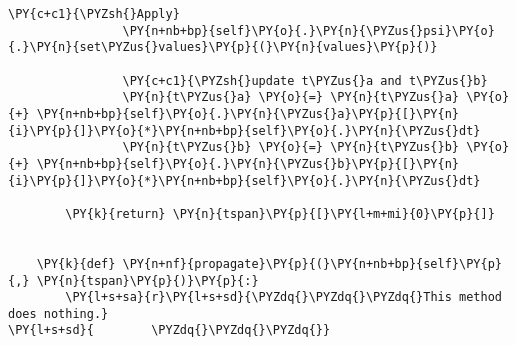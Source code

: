 \begin{Verbatim}[commandchars=\\\{\}]
                \PY{c+c1}{\PYZsh{}Apply}
                \PY{n+nb+bp}{self}\PY{o}{.}\PY{n}{\PYZus{}psi}\PY{o}{.}\PY{n}{set\PYZus{}values}\PY{p}{(}\PY{n}{values}\PY{p}{)}

                \PY{c+c1}{\PYZsh{}update t\PYZus{}a and t\PYZus{}b}
                \PY{n}{t\PYZus{}a} \PY{o}{=} \PY{n}{t\PYZus{}a} \PY{o}{+} \PY{n+nb+bp}{self}\PY{o}{.}\PY{n}{\PYZus{}a}\PY{p}{[}\PY{n}{i}\PY{p}{]}\PY{o}{*}\PY{n+nb+bp}{self}\PY{o}{.}\PY{n}{\PYZus{}dt}
                \PY{n}{t\PYZus{}b} \PY{o}{=} \PY{n}{t\PYZus{}b} \PY{o}{+} \PY{n+nb+bp}{self}\PY{o}{.}\PY{n}{\PYZus{}b}\PY{p}{[}\PY{n}{i}\PY{p}{]}\PY{o}{*}\PY{n+nb+bp}{self}\PY{o}{.}\PY{n}{\PYZus{}dt}

        \PY{k}{return} \PY{n}{tspan}\PY{p}{[}\PY{l+m+mi}{0}\PY{p}{]}


    \PY{k}{def} \PY{n+nf}{propagate}\PY{p}{(}\PY{n+nb+bp}{self}\PY{p}{,} \PY{n}{tspan}\PY{p}{)}\PY{p}{:}
        \PY{l+s+sa}{r}\PY{l+s+sd}{\PYZdq{}\PYZdq{}\PYZdq{}This method does nothing.}
\PY{l+s+sd}{        \PYZdq{}\PYZdq{}\PYZdq{}}
\end{Verbatim}
